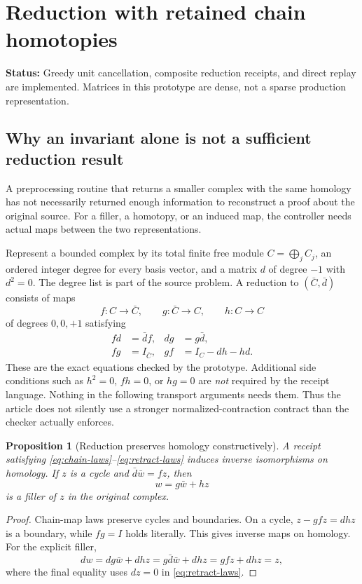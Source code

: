 \documentclass[11pt,letterpaper]{article}
\newtheorem{proposition}[theorem]{Proposition}
\theoremstyle{definition}\newtheorem{definition}[theorem]{Definition}
\theoremstyle{remark}\newtheorem{remark}[theorem]{Remark}
\newcommand{\status}[1]{\par\smallskip\textsf{\textbf{Status:} #1}\par\smallskip}
\begin{document}
\section{Reduction with retained chain homotopies}
\label{sec:reduction}
\status{Greedy unit cancellation, composite reduction receipts, and direct
replay are implemented. Matrices in this prototype are dense, not a sparse
production representation.}

\subsection{Why an invariant alone is not a sufficient reduction result}
A preprocessing routine that returns a smaller complex with the same homology
has not necessarily returned enough information to reconstruct a proof about
the original source. For a filler, a homotopy, or an induced map, the controller
needs actual maps between the two representations.

Represent a bounded complex by its total finite free module
$C=\bigoplus_j C_j$, an ordered integer degree for every basis vector, and a
matrix $d$ of degree $-1$ with $d^2=0$. The degree list is part of the source
problem. A reduction to $(\bar C,\bar d)$ consists of maps
\[
 f:C\to\bar C,\qquad g:\bar C\to C,\qquad h:C\to C
\]
of degrees $0,0,+1$ satisfying
\begin{align}
 fd&=\bar d f,& dg&=g\bar d,\label{eq:chain-laws}\\
 fg&=I_{\bar C},& gf&=I_C-dh-hd.\label{eq:retract-laws}
\end{align}
These are the exact equations checked by the prototype. Additional side
conditions such as $h^2=0$, $fh=0$, or $hg=0$ are \emph{not} required by the
receipt language. Nothing in the following transport arguments needs them.
Thus the article does not silently use a stronger normalized-contraction
contract than the checker actually enforces.

\begin{proposition}[Reduction preserves homology constructively]
A receipt satisfying \eqref{eq:chain-laws}--\eqref{eq:retract-laws} induces
inverse isomorphisms on homology. If $z$ is a cycle and
$\bar d\bar w=fz$, then
\begin{equation}\label{eq:lift-filler}
 w=g\bar w+hz
\end{equation}
is a filler of $z$ in the original complex.
\end{proposition}
\begin{proof}
Chain-map laws preserve cycles and boundaries. On a cycle,
$z-gfz=dhz$ is a boundary, while $fg=I$ holds literally. This gives inverse
maps on homology. For the explicit filler,
\[
 dw=dg\bar w+dhz=g\bar d\bar w+dhz=gfz+dhz=z,
\]
where the final equality uses $dz=0$ in \eqref{eq:retract-laws}.
\end{proof}
\end{document}

